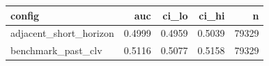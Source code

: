 \begin{tabular}{lrrrr}
\toprule
config & auc & ci\_lo & ci\_hi & n \\
\midrule
adjacent\_short\_horizon & 0.4999 & 0.4959 & 0.5039 & 79329 \\
benchmark\_past\_clv & 0.5116 & 0.5077 & 0.5158 & 79329 \\
\bottomrule
\end{tabular}
